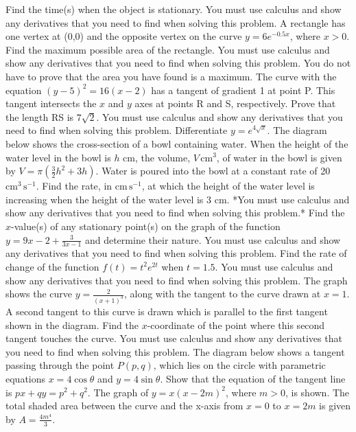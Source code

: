 \documentclass[12pt,addpoints]{exam}
\begin{document}
\begin{questions}
Find the time(s) when the object is stationary. You must use calculus and show any derivatives that you need to find when solving this problem.
\fillwithlines{3cm}
\question[5] A rectangle has one vertex at (0,0) and the opposite vertex on the curve \( y = 6e^{-0.5x} \), where \( x > 0 \). Find the maximum possible area of the rectangle. You must use calculus and show any derivatives that you need to find when solving this problem. You do not have to prove that the area you have found is a maximum.
\fillwithlines{3cm}
\question[5] The curve with the equation \((y - 5)^2 = 16(x - 2)\) has a tangent of gradient 1 at point P. This tangent intersects the \(x\) and \(y\) axes at points R and S, respectively. Prove that the length RS is \(7\sqrt{2}\). You must use calculus and show any derivatives that you need to find when solving this problem.
\fillwithlines{3cm}
\question[5] Differentiate \( y = e^{4\sqrt{x}} \).
\fillwithlines{3cm}
\question[5] The diagram below shows the cross-section of a bowl containing water. When the height of the water level in the bowl is \( h \) cm, the volume, \( V \, \text{cm}^3 \), of water in the bowl is given by \( V = \pi \left( \frac{3}{2} h^2 + 3h \right) \). Water is poured into the bowl at a constant rate of 20 \(\text{cm}^3 \, \text{s}^{-1}\). Find the rate, in \(\text{cm} \, \text{s}^{-1}\), at which the height of the water level is increasing when the height of the water level is 3 cm. *You must use calculus and show any derivatives that you need to find when solving this problem.*
\fillwithlines{3cm}
\question[5] Find the \( x \)-value(s) of any stationary point(s) on the graph of the function \( y = 9x - 2 + \frac{3}{3x - 1} \) and determine their nature. You must use calculus and show any derivatives that you need to find when solving this problem.
\fillwithlines{3cm}
\question[5] Find the rate of change of the function \( f(t) = t^2 e^{2t} \) when \( t = 1.5 \). You must use calculus and show any derivatives that you need to find when solving this problem.
\fillwithlines{3cm}
\question[5] The graph shows the curve \( y = \frac{2}{(x+1)^3} \), along with the tangent to the curve drawn at \( x = 1 \). A second tangent to this curve is drawn which is parallel to the first tangent shown in the diagram. Find the \( x \)-coordinate of the point where this second tangent touches the curve. You must use calculus and show any derivatives that you need to find when solving this problem.
\fillwithlines{3cm}
\question[5] The diagram below shows a tangent passing through the point \( P(p, q) \), which lies on the circle with parametric equations \( x = 4 \cos \theta \) and \( y = 4 \sin \theta \). Show that the equation of the tangent line is \( px + qy = p^2 + q^2 \).
\fillwithlines{3cm}
\question[5] The graph of \( y = x(x - 2m)^2 \), where \( m > 0 \), is shown. The total shaded area between the curve and the x-axis from \( x = 0 \) to \( x = 2m \) is given by \( A = \frac{4m^4}{3} \).


\end{questions}
\end{document}
